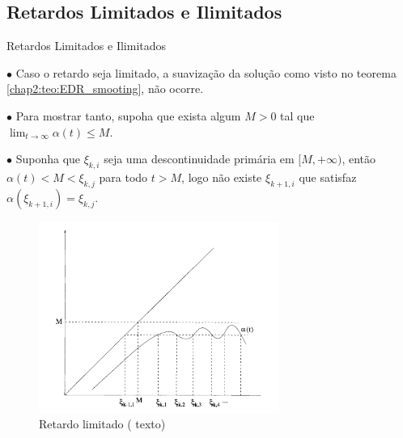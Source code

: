 \documentclass{beamer}
\theoremstyle{plain}
\theoremstyle{definition}
\begin{document}

\subsection{Retardos Limitados e Ilimitados}
\begin{frame}{Retardos Limitados e Ilimitados}

    \scriptsize
    $\bullet$ Caso o retardo seja limitado, a suavização da solução como visto no teorema \ref{chap2:teo:EDR_smooting}, não ocorre.

    $\bullet$ Para mostrar tanto, supoha que exista algum $M>0$ tal que \( \lim_{t \to \infty} \alpha(t) \leq M \).

    $\bullet$ Suponha que $\xi_{k, i}$ seja uma descontinuidade primária em $[M, +\infty)$, então $\alpha(t) < M < \xi_{k, j}$ para todo $t > M$, logo não existe $\xi_{k+1, i}$ que satisfaz $\alpha(\xi_{k+1, i}) = \xi_{k, j}$.

    \begin{figure}
        \begin{center}
            \includegraphics[width=0.7\textwidth, height=0.5\textheight]{retardo_limitado.png}
        \end{center}
        \caption{Retardo limitado ({\color{red} texto})}\label{fig:Retardo_limitado}
    \end{figure}


\end{frame}
\end{document}
